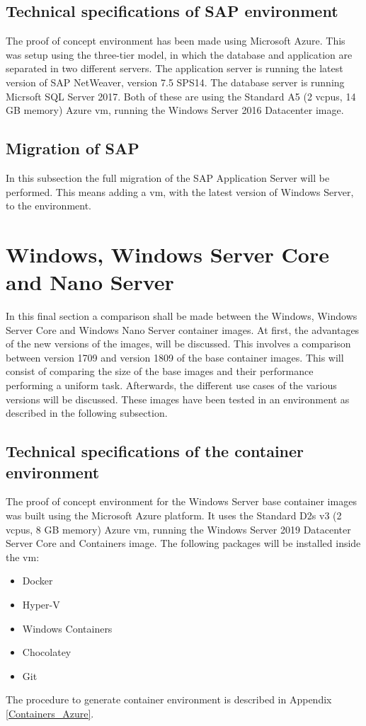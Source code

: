 \subsection{Technical specifications of SAP environment}
The proof of concept environment has been made using Microsoft Azure. This was setup using the three-tier model, in which the database and application are separated in two different servers. The application server is running the latest version of  SAP NetWeaver, version 7.5 SPS14. The database server is running Micrsoft SQL Server 2017. Both of these are using the Standard A5 (2 vcpus, 14 GB memory) Azure \acrshort{vm}, running the Windows Server 2016 Datacenter image. 

\subsection{Migration of SAP}
In this subsection the full migration of the SAP Application Server will be performed. This means adding a \acrshort{vm}, with the latest version of Windows Server, to the environment. 

\clearpage

\section{Windows, Windows Server Core and Nano Server}
In this final section a comparison shall be made between the Windows, Windows Server Core and Windows Nano Server container images. At first, the advantages of the new versions of the images, will be discussed. This involves a comparison between version 1709 and version 1809 of the base container images. This will consist of comparing the size of the base images and their performance performing a uniform task. Afterwards, the different use cases of the various versions will be discussed. These images have been tested in an environment as described in the following subsection.

\subsection{Technical specifications of the container environment}
The proof of concept environment for the Windows Server base container images was built using the Microsoft Azure platform. It uses the Standard D2s v3 (2 vcpus, 8 GB memory) Azure \acrshort{vm}, running the Windows Server 2019 Datacenter Server Core and Containers image.
The following packages will be installed inside the \acrshort{vm}:
\begin{itemize}
	\item Docker
	\item Hyper-V
	\item Windows Containers
	\item Chocolatey
	\item Git
\end{itemize}
The procedure to generate container environment is described in Appendix \ref{Containers_Azure}.

